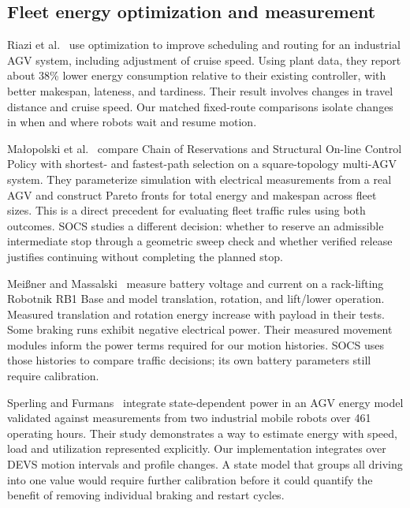 \documentclass[11pt,a4paper]{article}
\begin{document}
\subsection{Fleet energy optimization and measurement}
Riazi et al.~\cite{riazi2021} use optimization to improve scheduling and
routing for an industrial AGV system, including adjustment of cruise speed.
Using plant data, they report about 38\% lower energy consumption relative to
their existing controller, with better makespan, lateness, and tardiness.
Their result involves changes in travel distance and cruise speed. Our matched
fixed-route comparisons isolate changes in when and where robots wait and
resume motion.

Ma\l{}opolski et al.~\cite{malopolski2025} compare Chain of Reservations
and Structural On-line Control Policy with shortest- and fastest-path
selection on a square-topology multi-AGV system. They parameterize simulation
with electrical measurements from a real AGV and construct Pareto fronts for
total energy and makespan across fleet sizes. This is a direct precedent for
evaluating fleet traffic rules using both outcomes. SOCS studies a different
decision: whether to reserve an admissible intermediate stop through a
geometric sweep check and whether verified release justifies continuing
without completing the planned stop.

Mei\ss ner and Massalski~\cite{meissner2020} measure battery voltage and
current on a rack-lifting Robotnik RB1 Base and model translation, rotation,
and lift/lower operation. Measured translation and rotation energy increase
with payload in their tests. Some braking runs exhibit negative electrical
power. Their measured movement modules inform the power terms required for
our motion histories. SOCS uses those histories to compare traffic decisions;
its own battery parameters still require calibration.

Sperling and Furmans~\cite{sperling2024} integrate state-dependent power
in an AGV energy model validated against measurements from two industrial
mobile robots over 461 operating hours. Their study demonstrates a way to
estimate energy with speed, load and utilization represented explicitly.
Our implementation integrates over DEVS motion intervals and profile
changes. A state model that groups all driving into one value would
require further calibration before it could quantify the benefit of removing
individual braking and restart cycles.
\end{document}
